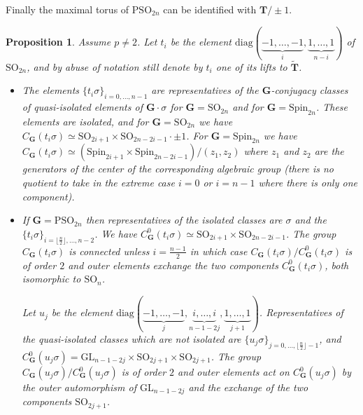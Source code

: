 \documentclass{amsart}
\newtheorem{proposition}[equation]{Proposition}
\numberwithin{equation}{section}
\theoremstyle{definition}
\theoremstyle{remark}
\newcommand\bG{{\mathbf G}}
\newcommand\bT{{\mathbf T}}
\newcommand\GL{\mathrm{GL}}
\newcommand\PSO{\mathrm{PSO}}
\newcommand\SO{\mathrm{SO}}
\newcommand\Spin{\mathrm{Spin}}
\newcommand\diag{\mathrm{diag}}
\begin{document}
Finally the maximal torus of $\PSO_{2n}$ can be identified with $\bT/\pm1$.
\begin{proposition} Assume $p\ne2$.
Let $t_i$ be the element
$\diag(\underbrace{-1,\ldots,-1}_i,\underbrace{1,\ldots,1}_{n-i})$ of
$\SO_{2n}$, and by abuse of notation still denote by $t_i$ one of its lifts to
$\tilde\bT$.
\begin{itemize}
\item The elements $\{t_i\sigma\}_{i=0,\ldots,n-1}$ are representatives of
the $\bG$-conjugacy classes of quasi-isolated elements of $\bG\cdot\sigma$
for $\bG=\SO_{2n}$ and for $\bG=\Spin_{2n}$. These elements are isolated,
and for $\bG=\SO_{2n}$ we have $C_\bG(t_i\sigma)\simeq
\SO_{2i+1}\times\SO_{2n-2i-1}\cdot\pm 1$. For $\bG=\Spin_{2n}$ we have
$C_\bG(t_i\sigma)\simeq(\Spin_{2i+1}\times\Spin_{2n-2i-1})/(z_1,z_2)$
where $z_1$ and $z_2$ are the
generators of the center of the corresponding algebraic group (there is no
quotient to take in the extreme case $i=0$ or $i=n-1$ where there is only one
component).
\item
If $\bG=\PSO_{2n}$ then representatives of the isolated classes are $\sigma$ and
the $\{t_i\sigma\}_{i=\lfloor\frac n2\rfloor,\ldots,n-2}$.
We have $C_\bG^0(t_i\sigma)\simeq
\SO_{2i+1}\times\SO_{2n-2i-1}$. The group $C_\bG(t_i\sigma)$ is connected
unless $i=\frac{n-1}2$ in which case $C_\bG(t_i\sigma)/C_\bG^0(t_i\sigma)$ 
is of order $2$ and outer elements exchange the two components 
$C_\bG^0(t_i\sigma)$, both isomorphic to $\SO_n$.

Let $u_j$ be the element $\diag(\underbrace{-1,\ldots,-1}_j,
\underbrace{i,\ldots,i}_{n-1-2j},\underbrace{1,\ldots,1}_{j+1})$.
Representatives of the quasi-isolated classes which are not 
isolated are $\{u_j\sigma\}_{j=0,\ldots,\lfloor\frac n2\rfloor-1}$, and
$C_\bG^0(u_j\sigma)=\GL_{n-1-2j}\times\SO_{2j+1}\times\SO_{2j+1}$.
The group $C_\bG(u_j\sigma)/C_\bG^0(u_j\sigma)$ 
is of order $2$ and outer elements act on $C_\bG^0(u_j\sigma)$ 
by the outer automorphism of $\GL_{n-1-2j}$ and 
the exchange of the two components $\SO_{2j+1}$.
\end{itemize}
\end{proposition}
\end{document}
